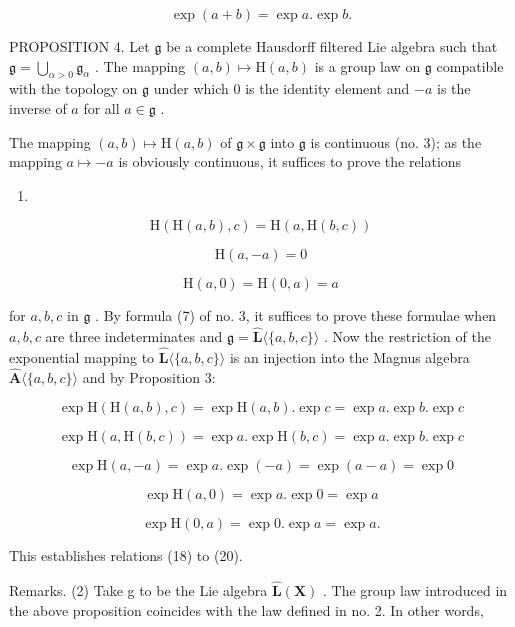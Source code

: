 \[
\exp (a + b) = \exp a. \exp b.
\]

PROPOSITION 4. Let \(\mathfrak{g}\) be a complete Hausdorff filtered Lie algebra such that \(\mathfrak{g} = \bigcup_{\alpha >0} \mathfrak{g}_{\alpha}\) . The mapping \((a, b) \mapsto \mathrm{H}(a, b)\) is a group law on \(\mathfrak{g}\) compatible with the topology on \(\mathfrak{g}\) under which \(0\) is the identity element and \(-a\) is the inverse of \(a\) for all \(a \in \mathfrak{g}\) .

The mapping \((a, b) \mapsto \mathrm{H}(a, b)\) of \(\mathfrak{g} \times \mathfrak{g}\) into \(\mathfrak{g}\) is continuous (no. 3); as the mapping \(a \mapsto -a\) is obviously continuous, it suffices to prove the relations

\begin{enumerate}
\def\labelenumi{(\arabic{enumi})}
\setcounter{enumi}{17}
\tightlist
\item
\end{enumerate}

\[
\mathrm{H} (\mathrm{H} (a, b), c) = \mathrm{H} (a, \mathrm{H} (b, c))\tag{18}
\]

\[
\mathrm{H} (a, - a) = 0\tag{19}
\]

\[
\mathrm{H} (a, 0) = \mathrm{H} (0, a) = a\tag{20}
\]

for \(a, b, c\) in \(\mathfrak{g}\) . By formula (7) of no. 3, it suffices to prove these formulae when \(a, b, c\) are three indeterminates and \(\mathfrak{g} = \hat{\mathbf{L}}\langle \{a, b, c\}\rangle\) . Now the restriction of the exponential mapping to \(\hat{\mathbf{L}}\langle \{a, b, c\}\rangle\) is an injection into the Magnus algebra \(\hat{\mathbf{A}}\langle \{a, b, c\}\rangle\) and by Proposition 3:

\[
\exp \mathrm{H} (\mathrm{H} (a, b), c) = \exp \mathrm{H} (a, b). \exp c = \exp a. \exp b. \exp c
\]

\[
\exp \mathrm{H} (a, \mathrm{H} (b, c)) = \exp a. \exp \mathrm{H} (b, c) = \exp a. \exp b. \exp c
\]

\[
\exp \mathrm{H} (a, - a) = \exp a. \exp (- a) = \exp (a - a) = \exp 0
\]

\[
\exp \mathrm{H} (a, 0) = \exp a. \exp 0 = \exp a
\]

\[
\exp \mathrm{H} (0, a) = \exp 0. \exp a = \exp a.
\]

This establishes relations (18) to (20).

Remarks. (2) Take g to be the Lie algebra \(\hat{\mathbf{L}}(\mathbf{X})\) . The group law introduced in the above proposition coincides with the law defined in no. 2. In other words,

